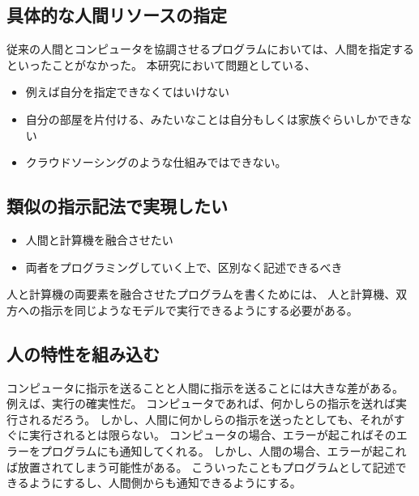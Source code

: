\subsection{具体的な人間リソースの指定}\label{ux5177ux4f53ux7684ux306aux4ebaux9593ux30eaux30bdux30fcux30b9ux306eux6307ux5b9a}

従来の人間とコンピュータを協調させるプログラムにおいては、人間を指定するといったことがなかった。
本研究において問題としている、

\begin{itemize}
\itemsep1pt\parskip0pt
\item
  例えば自分を指定できなくてはいけない
\item
  自分の部屋を片付ける、みたいなことは自分もしくは家族ぐらいしかできない
\item
  クラウドソーシングのような仕組みではできない。
\end{itemize}

\subsection{類似の指示記法で実現したい}\label{ux985eux4f3cux306eux6307ux793aux8a18ux6cd5ux3067ux5b9fux73feux3057ux305fux3044}

\begin{itemize}
\itemsep1pt\parskip0pt
\item
  人間と計算機を融合させたい
\item
  両者をプログラミングしていく上で、区別なく記述できるべき
\end{itemize}

人と計算機の両要素を融合させたプログラムを書くためには、
人と計算機、双方への指示を同じようなモデルで実行できるようにする必要がある。

\subsection{人の特性を組み込む}\label{ux4ebaux306eux7279ux6027ux3092ux7d44ux307fux8fbcux3080}

コンピュータに指示を送ることと人間に指示を送ることには大きな差がある。
例えば、実行の確実性だ。
コンピュータであれば、何かしらの指示を送れば実行されるだろう。
しかし、人間に何かしらの指示を送ったとしても、それがすぐに実行されるとは限らない。
コンピュータの場合、エラーが起こればそのエラーをプログラムにも通知してくれる。
しかし、人間の場合、エラーが起これば放置されてしまう可能性がある。
こういったこともプログラムとして記述できるようにするし、人間側からも通知できるようにする。

